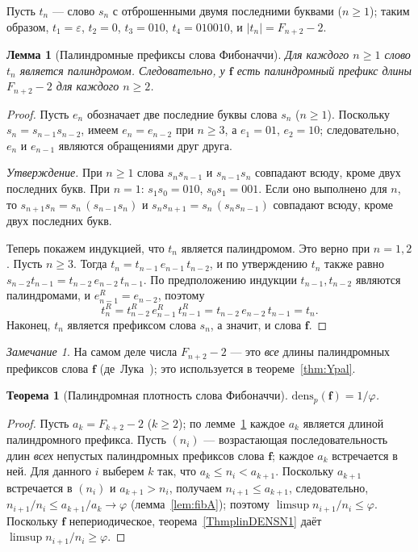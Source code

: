 \documentclass[a4paper,14pt]{extreport}
\theoremstyle{plain}
\newtheorem{theorem}{Теорема}[section]
\newtheorem{lemma}{Лемма}[section]
\theoremstyle{definition}
\theoremstyle{remark}
\newtheorem{remark}{Замечание}
\begin{document}
Пусть $t_n$ --- слово $s_n$ с отброшенными двумя последними буквами ($n\ge1$); таким образом, $t_1=\varepsilon$, $t_2=0$, $t_3=010$,
$t_4=010010$, и $|t_n|=F_{n+2}-2$.

\begin{lemma}[Палиндромные префиксы слова Фибоначчи]\label{lem:palFib}
	Для каждого $n\ge1$ слово $t_n$ является палиндромом. Следовательно, у $\mathbf f$ есть палиндромный префикс длины
	$F_{n+2}-2$ для каждого $n\ge2$.
\end{lemma}

\begin{proof}
	Пусть $e_n$ обозначает две последние буквы слова $s_n$ ($n\ge1$). Поскольку $s_n=s_{n-1}s_{n-2}$, имеем $e_n=e_{n-2}$ при $n\ge3$,
	а $e_1=01$, $e_2=10$; следовательно, $e_{n}$ и $e_{n-1}$ являются обращениями друг друга.
	
	\emph{Утверждение.} При $n\ge1$ слова $s_ns_{n-1}$ и $s_{n-1}s_n$ совпадают всюду, кроме двух последних букв.
	При $n=1$: $s_1s_0=010$, $s_0s_1=001$. Если оно выполнено для $n$, то
	$s_{n+1}s_n=s_n\,(s_{n-1}s_n)$ и $s_ns_{n+1}=s_n\,(s_ns_{n-1})$ совпадают всюду, кроме двух последних букв.
	
	Теперь покажем индукцией, что $t_n$ является палиндромом. Это верно при $n=1,2$. Пусть $n\ge3$. Тогда
	$t_n=t_{n-1}\,e_{n-1}\,t_{n-2}$, и по утверждению $t_n$ также равно $s_{n-2}t_{n-1}=t_{n-2}\,e_{n-2}\,t_{n-1}$.
	По предположению индукции $t_{n-1},t_{n-2}$ являются палиндромами, и $e_{n-1}^R=e_{n-2}$, поэтому
	\begin{equation}
		t_n^R=t_{n-2}^R\,e_{n-1}^R\,t_{n-1}^R=t_{n-2}\,e_{n-2}\,t_{n-1}=t_n .
	\end{equation}
	Наконец, $t_n$ является префиксом слова $s_n$, а значит, и слова $\mathbf f$.
\end{proof}

\begin{remark}
	На самом деле числа $F_{n+2}-2$ --- это \emph{все} длины палиндромных префиксов слова $\mathbf f$ (де~Лука~\cite{DeLuca1997}); это используется в теореме~\ref{thm:Ypal}.
\end{remark}

\begin{theorem}[Палиндромная плотность слова Фибоначчи]\label{thm:palFib}
	$\mathrm{dens}_p(\mathbf f)=1/\varphi$.
\end{theorem}

\begin{proof}
	Пусть $a_k=F_{k+2}-2$ ($k\ge2$); по лемме~\ref{lem:palFib} каждое $a_k$ является длиной палиндромного префикса.
	Пусть $(n_i)$ --- возрастающая последовательность длин \emph{всех} непустых палиндромных префиксов слова $\mathbf f$; каждое $a_k$ встречается в ней.
	Для данного $i$ выберем $k$ так, что $a_k\le n_i<a_{k+1}$. Поскольку $a_{k+1}$ встречается в $(n_i)$ и $a_{k+1}>n_i$, получаем $n_{i+1}\le a_{k+1}$, следовательно,
	$n_{i+1}/n_i\le a_{k+1}/a_k\to\varphi$ (лемма~\ref{lem:fibA}); поэтому $\limsup n_{i+1}/n_i\le\varphi$.
	Поскольку $\mathbf f$ непериодическое, теорема~\ref{ThmplinDENSN1} даёт $\limsup n_{i+1}/n_i\ge\varphi$.
\end{proof}
\end{document}
